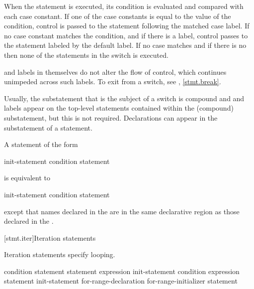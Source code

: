 \pnum
When the  statement is executed, its condition is
evaluated and compared with each case constant.
%
If one of the case constants is equal to the value of the condition,
control is passed to the statement following the matched case label. If
no case constant matches the condition, and if there is a
%
 label, control passes to the statement labeled by the
default label. If no case matches and if there is no 
then none of the statements in the switch is executed.

\pnum
{} and  labels in themselves do not alter the
flow of control, which continues unimpeded across such labels. To exit
from a switch, see , \ref{stmt.break}.
\begin{note}
Usually, the substatement that is the subject of a switch is compound
and  and  labels appear on the top-level
statements contained within the (compound) substatement, but this is not
required.
%
Declarations can appear in the substatement of a
 statement.
\end{note}

\pnum
A  statement of the form

\begin{ncbnf}
 init-statement condition \terminal{)} statement
\end{ncbnf}

is equivalent to

\begin{ncbnftab}
\terminal{\{}\br
\>init-statement\br
\> condition \terminal{)} statement\br
\terminal{\}}
\end{ncbnftab}

except that names declared in the  are in
the same declarative region as those declared in the
.%

[stmt.iter]{Iteration statements}%

\pnum
Iteration statements specify looping.

%
%
%
%
\begin{bnf}
\br
     condition \terminal{)} statement\br
     statement  expression \terminal{) ;}\br
     init-statement condition\opt{} \terminal{;} expression\opt{} \terminal{)} statement\br
     init-statement\opt{} for-range-declaration \terminal{:} for-range-initializer \terminal{)} statement
\end{bnf}

